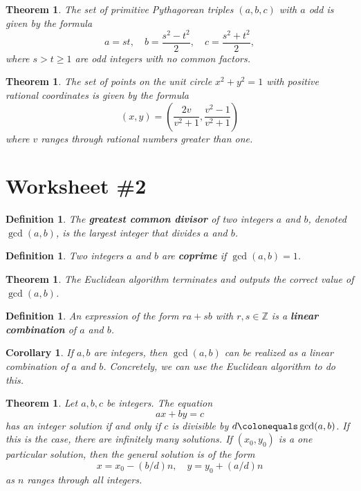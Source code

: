 \documentclass[12pt]{amsart}
\newcommand{\Z}{\mathbb{Z}}
\newcommand{\ceq}{\colonequals}
\numberwithin{equation}{section}
\theoremstyle{plain} %
\newtheorem{thm}	[section]	{Theorem}
\newtheorem{cor}	[section]	{Corollary}
\newtheorem{defn}	[section]	{Definition}
\begin{document}
\begin{thm} The set of primitive Pythagorean triples $(a,b,c)$ with $a$ odd is given by the formula
\[ a=st, \quad b=\frac{s^2-t^2}{2} , \quad c=\frac{s^2+t^2}{2},\]
where $s>t\geq 1$ are odd integers with no common factors.\end{thm}

\begin{thm} The set of points on the unit circle $x^2+y^2=1$ with positive rational coordinates is given by the formula
\[ (x,y) = \left( \frac{ 2v}{v^2+1}, \frac{v^2-1}{v^2+1} \right)\]
where $v$ ranges through rational numbers greater than one. \end{thm}



\section*{Worksheet \#2}


\begin{defn} The \textbf{greatest common divisor} of two integers $a$ and $b$, denoted $\gcd(a,b)$, is the largest integer that divides $a$ and $b$.\end{defn}


\begin{defn} Two integers $a$ and $b$ are \textbf{coprime} if $\gcd(a,b)=1$.\end{defn}


\begin{thm}
The Euclidean algorithm terminates and outputs the correct value of $\gcd(a,b)$.
\end{thm}


\begin{defn}  An expression of the form $ra+sb$ with $r,s\in \Z$ is a \textbf{linear combination} of $a$ and $b$.\end{defn}

\begin{cor} If $a,b$ are integers, then $\gcd(a,b)$ can be realized as a linear combination of $a$ and $b$. Concretely, we can use the Euclidean algorithm to do this.
\end{cor}

\begin{thm} Let $a,b,c$ be integers. The equation 
\[ ax+by=c\]
has an integer solution if and only if $c$ is divisible by $d\ceq \gcd(a,b)$. If this is the case, there are infinitely many solutions. If $(x_0,y_0)$ is a one particular solution, then the general solution is of the form
\[ x = x_0 - (b/d)n ,\quad y= y_0+(a/d) n\]
as $n$ ranges through all integers.
\end{thm}
\end{document}
